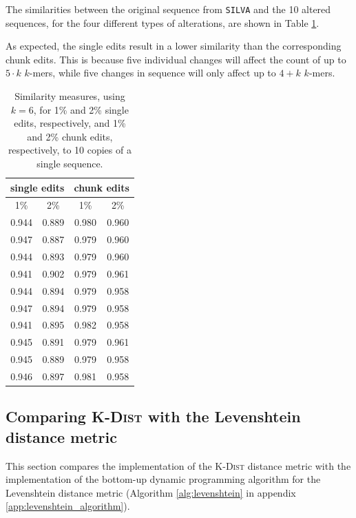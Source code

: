 The similarities between the original sequence from \texttt{SILVA} and the 10
altered sequences, for the four different types of alterations, are shown in
Table \ref{tab:altered_seqs_similarities}.

As expected, the single edits result in a lower similarity than the
corresponding chunk edits. This is because five individual changes will affect
the count of up to $5 \cdot k$ $k$-mers, while five changes in sequence will
only affect up to $4+k$ $k$-mers.

\begin{table}[H]
  \centering
  \begin{tabular}{c|c||c|c}
    \multicolumn{2}{c||}{single edits}  & \multicolumn{2}{c}{chunk edits} \\
    \hline\hline
    1\%   &   2\%                   &   1\%   &   2\% \\
    \hline
    0.944   & 0.889                     & 0.980     & 0.960 \\
    0.947   & 0.887                     & 0.979     & 0.960 \\
    0.944   & 0.893                     & 0.979     & 0.960 \\
    0.941   & 0.902                     & 0.979     & 0.961 \\
    0.944   & 0.894                     & 0.979     & 0.958 \\
    0.947   & 0.894                     & 0.979     & 0.958 \\
    0.941   & 0.895                     & 0.982     & 0.958 \\
    0.945   & 0.891                     & 0.979     & 0.961 \\
    0.945   & 0.889                     & 0.979     & 0.958 \\
    0.946   & 0.897                     & 0.981     & 0.958
  \end{tabular}
  \caption{Similarity measures, using $k=6$, for 1\% and 2\% single edits,
    respectively, and 1\% and 2\% chunk edits, respectively, to 10 copies of a
    single sequence.}
  \label{tab:altered_seqs_similarities}
\end{table}


\subsection{Comparing \textsc{K-Dist} with the Levenshtein distance metric}
\label{sec:kdist_vs_levenshtein}

This section compares the implementation of the \textsc{K-Dist} distance
metric with the implementation of the bottom-up dynamic programming algorithm
for the Levenshtein distance metric (Algorithm \ref{alg:levenshtein} in
appendix \ref{app:levenshtein_algorithm}).

